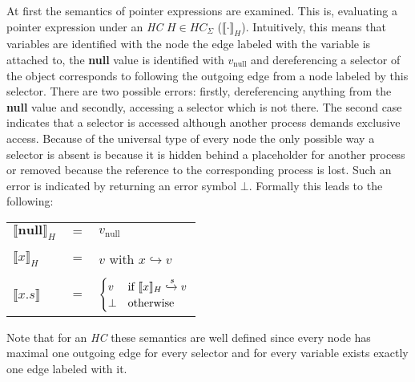 	At first the semantics of pointer expressions are examined.
	This is, evaluating a pointer expression under an \emph{\ac{HC}}
	$H\in\mathit{HC}_\Sigma$ ($\llbracket\cdot\rrbracket_H$). Intuitively, this
	means that variables are identified with the node the edge labeled with the
	variable is attached to, the \textbf{null} value is identified with
	$v_{\text{null}}$ and dereferencing a selector of the object corresponds to
	following the outgoing edge from a node labeled by this selector. There are
	two possible errors: firstly, dereferencing anything from the \textbf{null}
	value and secondly, accessing a selector which is not there. The second case
	indicates that a selector is accessed although another process demands
	exclusive access. Because of the universal type of every node the only
	possible way a selector is absent is because it is hidden behind a
	placeholder for another process or removed because the reference to the
	corresponding process is lost. Such an error is indicated by returning an
	error symbol $\bot$. Formally this leads to the following:
	\begin{center}
		\begin{tabular}{lcl}
			$\llbracket \textbf{null}\rrbracket_H$ & $=$ & $v_{\text{null}}$\\
			&&\\
				$\llbracket x\rrbracket_{H}$ & $=$ & $v$\hspace{0.65cm} with
				$x\hookrightarrow v$\\
			&&\\
			$\llbracket x.s\rrbracket$ & $=$ & $
			\begin{cases}
				v    &\text{if } \llbracket x\rrbracket_{H}\xhookrightarrow{s} v\\
				\bot &\text{otherwise}\\
			\end{cases}
			$\\
		\end{tabular}
	\end{center}
	Note that for an \emph{\ac{HC}} these semantics are well defined since
	every node has maximal one outgoing edge for every selector and for every
	variable exists exactly one edge labeled with it.

